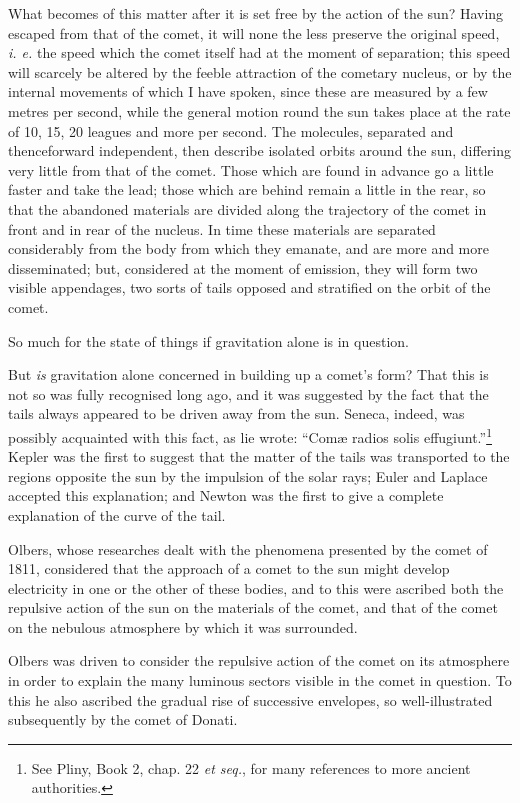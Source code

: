 \documentclass[a4paper, 12pt, oneside, polutonikogreek, english]{article}
\begin{document}
What becomes of this matter after it is set free by the action of the sun? Having escaped from that of the comet, it will none the less preserve the original speed, \emph{i. e.} the speed which the comet itself had at the moment of separation; this speed will scarcely be altered by the feeble attraction of the cometary nucleus, or by the internal movements of which I have spoken, since these are measured by a few metres per second, while the general motion round the sun takes place at the rate of 10, 15, 20 leagues and more per second. The molecules, separated and thenceforward independent, then describe isolated orbits around the sun, differing very little from that of the comet. Those which are found in advance go a little faster and take the lead; those which are behind remain a little in the rear, so that the abandoned materials are divided along the trajectory of the comet in front and in rear of the nucleus. In time these materials are separated considerably from the body from which they emanate, and are more and more disseminated; but, considered at the moment of emission, they will form two visible appendages, two sorts of tails opposed and stratified on the orbit of the comet.

So much for the state of things if gravitation alone is in question.

But \emph{is} gravitation alone concerned in building up a comet's form? That this is not so was fully recognised long ago, and it was suggested by the fact that the tails always appeared to be driven away from the sun. Seneca, indeed, was possibly acquainted with this fact, as lie wrote: ``Comæ radios solis effugiunt.''\footnote{See Pliny, Book 2, chap. 22 \emph{et seq.}, for many references to more ancient authorities.} Kepler was the first to suggest that the matter of the tails was transported to the regions opposite the sun by the impulsion of the solar rays; Euler and Laplace accepted this explanation; and Newton was the first to give a complete explanation of the curve of the tail.

Olbers, whose researches dealt with the phenomena presented by the comet of 1811, considered that the approach of a comet to the sun might develop electricity in one or the other of these bodies, and to this were ascribed both the repulsive action of the sun on the materials of the comet, and that of the comet on the nebulous atmosphere by which it was surrounded.

Olbers was driven to consider the repulsive action of the comet on its atmosphere in order to explain the many luminous sectors visible in the comet in question. To this he also ascribed the gradual rise of successive envelopes, so well-illustrated subsequently by the comet of Donati.
\end{document}
